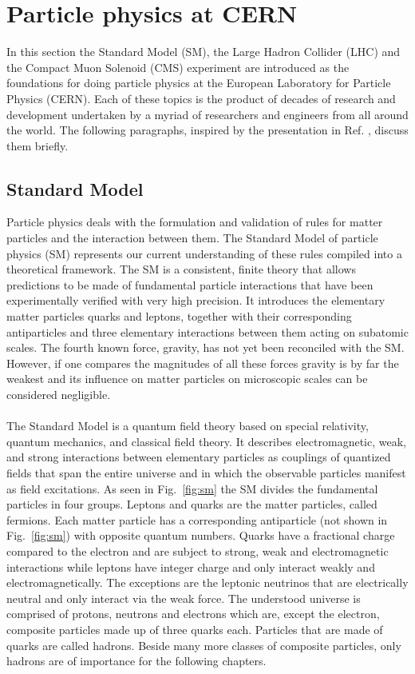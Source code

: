 \documentclass[../../main.tex]{subfiles}
\begin{document}
\section{Particle physics at CERN}\label{sec:cern}
In this section the Standard Model (SM), the Large Hadron Collider (LHC) and the Compact Muon Solenoid (CMS) experiment are introduced as the foundations for doing particle physics at the European Laboratory for Particle Physics (CERN). Each of these topics is the product of decades of research and development undertaken by a myriad of researchers and engineers from all around the world. The following paragraphs, inspired by the presentation in Ref. \cite{mr}, discuss them briefly.

\subsection{Standard Model}\label{sec:sm}
Particle physics deals with the formulation and validation of rules for matter particles and the interaction between them. The Standard Model of particle physics (SM) represents our current understanding of these rules compiled into a theoretical framework. The SM is a consistent, finite theory that allows predictions to be made of fundamental particle interactions that have been experimentally verified with very high precision. It introduces the elementary matter particles quarks and leptons, together with their corresponding antiparticles and three elementary interactions between them acting on subatomic scales. The fourth known force, gravity, has not yet been reconciled with the SM. However, if one compares the magnitudes of all these forces gravity is by far the weakest and its influence on matter particles on microscopic scales can be considered negligible.\\
\\
The Standard Model is a quantum field theory based on special relativity, quantum mechanics, and classical field theory. It describes electromagnetic, weak, and strong interactions between elementary particles as couplings of quantized fields that span the entire universe and in which the observable particles manifest as field excitations. As seen in Fig.~\ref{fig:sm} the SM divides the fundamental particles in four groups. Leptons and quarks are the matter particles, called fermions. Each matter particle has a corresponding antiparticle (not shown in Fig.~\ref{fig:sm}) with opposite quantum numbers. Quarks have a fractional charge compared to the electron and are subject to strong, weak and electromagnetic interactions while leptons have integer charge and only interact weakly and electromagnetically. The exceptions are the leptonic neutrinos that are electrically neutral and only interact via the weak force. The understood universe is comprised of protons, neutrons and electrons which are, except the electron, composite particles made up of three quarks each. Particles that are made of quarks are called hadrons. Beside many more classes of composite particles, only hadrons are of importance for the following chapters.
\end{document}
